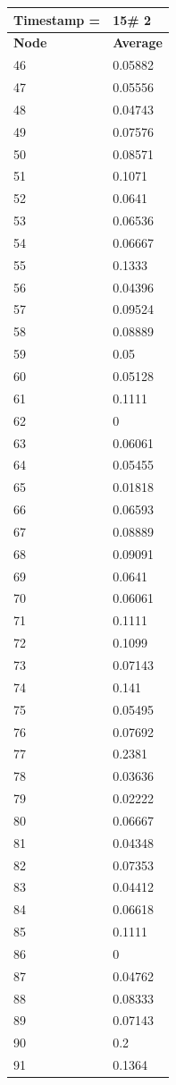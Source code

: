 \begin{tabular}{|l||l|}
\hline
\textbf{Timestamp =} & \textbf{15}\# 2\\\hline
	\textbf{Node} & \textbf{Average} \\ \hline
\hline
	46 & 0.05882 \\ \hline
	47 & 0.05556 \\ \hline
	48 & 0.04743 \\ \hline
	49 & 0.07576 \\ \hline
	50 & 0.08571 \\ \hline
	51 & 0.1071 \\ \hline
	52 & 0.0641 \\ \hline
	53 & 0.06536 \\ \hline
	54 & 0.06667 \\ \hline
	55 & 0.1333 \\ \hline
	56 & 0.04396 \\ \hline
	57 & 0.09524 \\ \hline
	58 & 0.08889 \\ \hline
	59 & 0.05 \\ \hline
	60 & 0.05128 \\ \hline
	61 & 0.1111 \\ \hline
	62 & 0 \\ \hline
	63 & 0.06061 \\ \hline
	64 & 0.05455 \\ \hline
	65 & 0.01818 \\ \hline
	66 & 0.06593 \\ \hline
	67 & 0.08889 \\ \hline
	68 & 0.09091 \\ \hline
	69 & 0.0641 \\ \hline
	70 & 0.06061 \\ \hline
	71 & 0.1111 \\ \hline
	72 & 0.1099 \\ \hline
	73 & 0.07143 \\ \hline
	74 & 0.141 \\ \hline
	75 & 0.05495 \\ \hline
	76 & 0.07692 \\ \hline
	77 & 0.2381 \\ \hline
	78 & 0.03636 \\ \hline
	79 & 0.02222 \\ \hline
	80 & 0.06667 \\ \hline
	81 & 0.04348 \\ \hline
	82 & 0.07353 \\ \hline
	83 & 0.04412 \\ \hline
	84 & 0.06618 \\ \hline
	85 & 0.1111 \\ \hline
	86 & 0 \\ \hline
	87 & 0.04762 \\ \hline
	88 & 0.08333 \\ \hline
	89 & 0.07143 \\ \hline
	90 & 0.2 \\ \hline
	91 & 0.1364 \\ \hline
\end{tabular}

